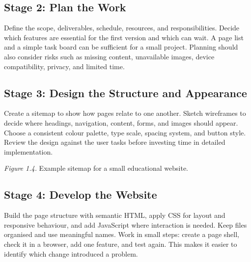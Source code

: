 \documentclass[11pt,openany,oneside]{book}
\begin{document}
\subsection{Stage 2: Plan the Work}
Define the scope, deliverables, schedule, resources, and responsibilities. Decide which features are essential for the first version and which can wait. A page list and a simple task board can be sufficient for a small project. Planning should also consider risks such as missing content, unavailable images, device compatibility, privacy, and limited time.

\subsection{Stage 3: Design the Structure and Appearance}
Create a sitemap to show how pages relate to one another. Sketch wireframes to decide where headings, navigation, content, forms, and images should appear. Choose a consistent colour palette, type scale, spacing system, and button style. Review the design against the user tasks before investing time in detailed implementation.

\begin{center}
\end{center}
\textit{Figure 1.4.} Example sitemap for a small educational website.

\subsection{Stage 4: Develop the Website}
Build the page structure with semantic HTML, apply CSS for layout and responsive behaviour, and add JavaScript where interaction is needed. Keep files organised and use meaningful names. Work in small steps: create a page shell, check it in a browser, add one feature, and test again. This makes it easier to identify which change introduced a problem.
\end{document}
